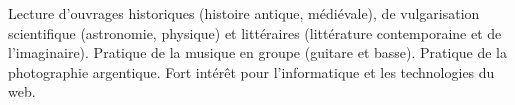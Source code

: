 

\begin{cvparagraph}

Lecture d’ouvrages historiques (histoire antique, médiévale), de vulgarisation scientifique (astronomie, physique) et littéraires (littérature contemporaine et de l’imaginaire). Pratique de la musique en groupe (guitare et basse). Pratique de la photographie argentique. Fort intérêt pour l’informatique et les technologies du web.
\end{cvparagraph}
